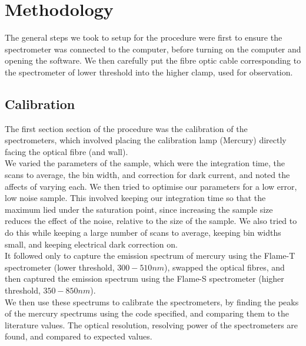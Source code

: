 \documentclass{article}
\begin{document}
\section{Methodology}
The general steps we took to setup for the procedure were first to ensure the spectrometer was connected to the computer, before turning on the computer and opening the software. We then carefully put the fibre optic cable corresponding to the spectrometer of lower threshold  into the higher clamp, used for observation.

\subsection{Calibration}
\label{sec:calibration}
The first section section of the procedure was the calibration of the spectrometers, which involved placing the calibration lamp (Mercury) directly facing the optical fibre (and wall).\\
\indent We varied the parameters of the sample, which were the integration time, the scans to average, the bin width, and correction for dark current, and noted the affects of varying each. We then tried to optimise our parameters for a low error, low noise sample. This involved keeping our integration time so that the maximum lied under the saturation point, since increasing the sample size reduces the effect of the noise, relative to the size of the sample. We also tried to do this while keeping a large number of scans to average, keeping bin widths small, and keeping electrical dark correction on.\\
\indent It followed only to capture the emission spectrum of mercury using the Flame-T spectrometer (lower threshold, $300-510nm$), swapped the optical fibres, and then captured the emission spectrum using the Flame-S spectrometer (higher threshold, $350-850nm$).\\
\indent We then use these spectrums to calibrate the spectrometers, by finding the peaks of the mercury spectrums using the code specified, and comparing them to the literature values. The optical resolution, resolving power of the spectrometers are found, and compared to expected values.\\
\indent 
\end{document}
